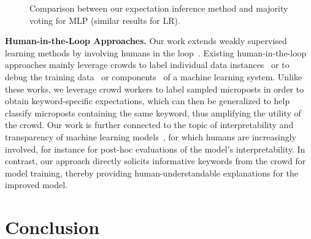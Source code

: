 \documentclass[letterpaper]{article}
\begin{document}
\begin{figure}
       \centering
        \caption{Comparison between our expectation inference method and majority voting for MLP (similar results for LR).}
        \label{fig:Q3}
\end{figure}


\smallskip
\noindent\textbf{Human-in-the-Loop Approaches.} Our work extends weakly supervised learning methods by involving humans in the loop~\cite{vaughan2017making}. Existing human-in-the-loop approaches mainly leverage crowds to label individual data instances~\cite{yan2011active,yang2018leveraging} or to debug the training data~\cite{krishnan2016activeclean,yang2019scalpel} or components~\cite{parikh2011human,mottaghi2013analyzing,nushi2017human} of a machine learning system. Unlike these works, we leverage crowd workers to label sampled microposts in order to obtain keyword-specific expectations, which can then be generalized to help classify microposts containing the same keyword, thus amplifying the utility of the crowd. Our work is further connected to the topic of interpretability and transparency of machine learning models~\cite{ribeiro2016should,lipton2016mythos,doshi2017towards}, for which humans are increasingly involved, for instance for post-hoc evaluations of the model's interpretability. In contrast, our approach directly solicits informative keywords from the crowd for model training, thereby providing human-understandable explanations for the improved model.

\section{Conclusion}
\label{sec:conclusion}
\end{document}
